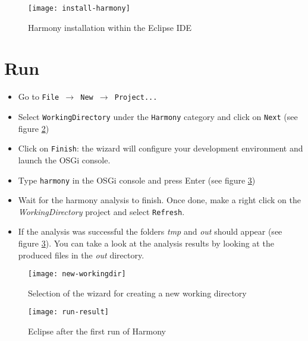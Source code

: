 	\begin{figure}[H]
		\centering
		\texttt{[image: install-harmony]}
		\caption{Harmony installation within the Eclipse IDE}
		\label{fig:harmonyInstall}
	\end{figure}



\section{Run}\label{sec:RunInEclipse}

	\begin{itemize}
		\item Go to \texttt{File $\rightarrow$ New $\rightarrow$ Project...}
		\item Select \texttt{WorkingDirectory} under the \texttt{Harmony} category and click on \texttt{Next} (see figure \ref{fig:new-workingdir})
		\item Click on \texttt{Finish}: the wizard will configure your development environment and launch the OSGi console. 
		\item Type \texttt{harmony} in the OSGi console and press Enter (see figure \ref{fig:run-result})
		\item Wait for the harmony analysis to finish. Once done, make a right click on the \emph{WorkingDirectory} project and select \texttt{Refresh}.
		\item If the analysis was successful the folders \emph{tmp} and \emph{out} should appear (see figure \ref{fig:run-result}). You can take a look at the analysis results by looking at the produced files in the \emph{out} directory.
	\end{itemize}
	
	\begin{figure}[H]
		\centering
		\texttt{[image: new-workingdir]}
		\caption{Selection of the wizard for creating a new working directory}
		\label{fig:new-workingdir}
	\end{figure}
	
	\begin{figure}[H]
		\centering
		\texttt{[image: run-result]}
		\caption{Eclipse after the first run of Harmony}
		\label{fig:run-result}
	\end{figure}